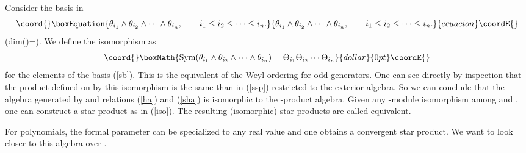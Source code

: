 \documentclass[a4paper,12pt]{article}
\begin{document}
Consider the basis in \coordHE{}
\begin{equation}\coord{}\boxEquation{
\theta_{i_1}\wedge\theta_{i_2}\wedge\cdots \wedge \theta_{i_n},
\qquad i_1\leq i_2\leq\cdots \leq i_n.
\label{sb}
}{
\theta_{i_1}\wedge\theta_{i_2}\wedge\cdots \wedge \theta_{i_n},
\qquad i_1\leq i_2\leq\cdots \leq i_n.
}{ecuacion}\coordE{}\end{equation}
(dim(\coordHE{})=\coordHE{}).
We define the isomorphism \coordHE{} as
$$\coord{}\boxMath{
\mbox{Sym}(\theta_{i_1}\wedge\theta_{i_2}\wedge\cdots \wedge
\theta_{i_n})=
\Theta_{i_1}\Theta_{i_2}\cdots  \Theta_{i_n}
}{dollar}{0pt}\coordE{}$$
for the elements of the basis (\ref{sb}). This is the equivalent of the
Weyl ordering for odd generators. One can  see directly by inspection that
the product defined on \coordHE{} by this isomorphism is the
same than \myHighlight{$\star$}\coordHE{} in (\ref{ssp}) restricted to the exterior algebra. So
we can conclude that the algebra generated by \coordHE{} and relations
(\ref{ha}) and (\ref{sha}) is isomorphic to the \myHighlight{$\star$}\coordHE{}-product algebra.
Given
any \myHighlight{$\R[[h]]$}\coordHE{}-module isomorphism among  \coordHE{} and
\coordHE{},
one can construct a star product as in (\ref{iso}). The resulting
(isomorphic) star products are called equivalent.

For polynomials, the formal parameter \coordHE{} can be specialized to any real
value and one obtains a convergent star product. We want to look closer
to this algebra over \myHighlight{$\R$}\coordHE{}.
\end{document}
